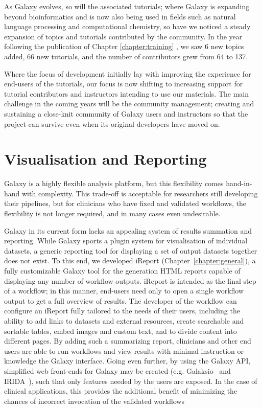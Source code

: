 As Galaxy evolves, so will the associated tutorials; where Galaxy is expanding beyond bioinformatics and is now also being used in fields such as natural language processing and computational chemistry, so have we noticed a steady expansion of topics and tutorials contributed by the community. In the year following the publication of Chapter \ref{chapter:training} , we saw 6 new topics added, 66 new tutorials, and the number of contributors grew from 64 to 137.

Where the focus of development initially lay with improving the experience for end-users of the tutorials, our focus is now shifting to increasing support for tutorial contributors and instructors intending to use our materials. The main challenge in the coming years will be the community management; creating and sustaining a close-knit community of Galaxy users and instructors so that the project can survive even when its original developers have moved on.


\section{Visualisation and Reporting}
Galaxy is a highly flexible analysis platform, but this flexibility comes hand-in-hand with complexity. This trade-off is acceptable for researchers still developing their pipelines, but for clinicians who have fixed and validated workflows, the flexibility is not longer required, and in many cases even undesirable.

Galaxy in its current form lacks an appealing system of results summation and reporting. While Galaxy sports a plugin system for visualisation of individual datasets, a generic reporting tool for displaying a set of output datasets together does not exist. To this end, we developed iReport (Chapter~\ref{chapter:general}), a fully customizable Galaxy tool for the generation HTML reports capable of displaying any number of workflow outputs. iReport is intended as the final step of a workflow; in this manner, end-users need only to open a single workflow output to get a full overview of results. The developer of the workflow can configure an iReport fully tailored to the needs of their users, including the ability to add links to datasets and external resources, create searchable and sortable tables, embed images and custom text, and to divide content into different pages. By adding such a summarizing report, clinicians and other end users are able to run workflows and view results with minimal instruction or knowledge the Galaxy interface. Going even further, by using the Galaxy API, simplified web front-ends for Galaxy may be created (e.g. Galaksio~\cite{Klingstrm2017} and IRIDA~\cite{matthews2018integrated}), such that only features needed by the users are exposed. In the case of clinical applications, this provides the additional benefit of minimizing the chances of incorrect invocation of the validated workflows


